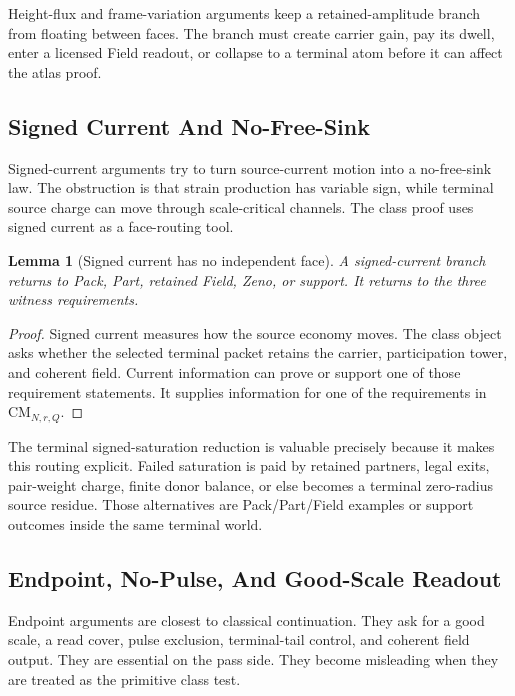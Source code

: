 \documentclass[11pt]{article}
\newtheorem{lemma}{Lemma}
\newcommand{\CM}{\mathrm{CM}}
\begin{document}
Height-flux and frame-variation arguments keep a retained-amplitude branch from floating between faces.
The branch must create carrier gain, pay its dwell, enter a licensed Field readout, or collapse to a terminal atom before it can affect the atlas proof.

\subsection{Signed Current And No-Free-Sink}

Signed-current arguments try to turn source-current motion into a no-free-sink law.
The obstruction is that strain production has variable sign, while terminal source charge can move through scale-critical channels.
The class proof uses signed current as a face-routing tool.

\begin{lemma}[Signed current has no independent face]
A signed-current branch returns to Pack, Part, retained Field, Zeno, or support.
It returns to the three witness requirements.
\end{lemma}

\begin{proof}
Signed current measures how the source economy moves.
The class object asks whether the selected terminal packet retains the carrier, participation tower, and coherent field.
Current information can prove or support one of those requirement statements.
It supplies information for one of the requirements in \(\CM_{N,r,Q}\).
\end{proof}

The terminal signed-saturation reduction is valuable precisely because it makes this routing explicit.
Failed saturation is paid by retained partners, legal exits, pair-weight charge, finite donor balance, or else becomes a terminal zero-radius source residue.
Those alternatives are Pack/Part/Field examples or support outcomes inside the same terminal world.

\subsection{Endpoint, No-Pulse, And Good-Scale Readout}

Endpoint arguments are closest to classical continuation.
They ask for a good scale, a read cover, pulse exclusion, terminal-tail control, and coherent field output.
They are essential on the pass side.
They become misleading when they are treated as the primitive class test.
\end{document}
